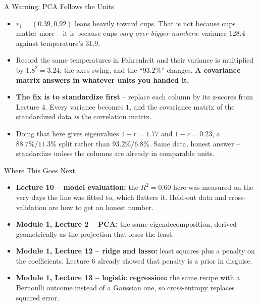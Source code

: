 \begin{frame}{A Warning: PCA Follows the Units}
\begin{itemize}
  \item $v_1 = (0.39, 0.92)$ leans heavily toward cups. That is not because cups matter more -- it is because cups \emph{vary over bigger numbers}: variance $128.4$ against temperature's $31.9$.
  \pause
  \item Record the same temperatures in Fahrenheit and their variance is multiplied by $1.8^2 = 3.24$; the axes swing, and the ``$93.2\%$'' changes. \textbf{A covariance matrix answers in whatever units you handed it.}
  \pause
  \item \textbf{The fix is to standardize first} -- replace each column by its z-scores from Lecture 4. Every variance becomes $1$, and the covariance matrix of the standardized data \emph{is} the correlation matrix.
  \pause
  \item Doing that here gives eigenvalues $1 + r = 1.77$ and $1 - r = 0.23$, a $88.7\%/11.3\%$ split rather than $93.2\%/6.8\%$. Same data, honest answer -- standardize unless the columns are already in comparable units.
\end{itemize}
\end{frame}

\begin{frame}{Where This Goes Next}
\begin{itemize}
  \item \textbf{Lecture 10 -- model evaluation:} the $R^2 = 0.60$ here was measured on the very days the line was fitted to, which flatters it. Held-out data and cross-validation are how to get an honest number.
  \pause
  \item \textbf{Module 1, Lecture 2 -- PCA:} the same eigendecomposition, derived geometrically as the projection that loses the least.
  \pause
  \item \textbf{Module 1, Lecture 12 -- ridge and lasso:} least squares plus a penalty on the coefficients. Lecture 6 already showed that penalty is a prior in disguise.
  \pause
  \item \textbf{Module 1, Lecture 13 -- logistic regression:} the same recipe with a Bernoulli outcome instead of a Gaussian one, so cross-entropy replaces squared error.
\end{itemize}
\end{frame}

